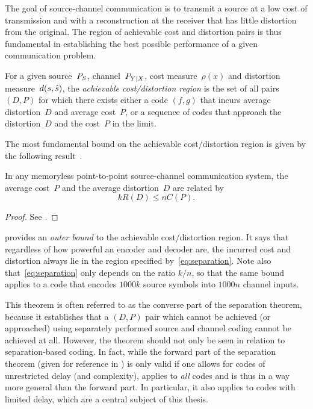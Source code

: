 The goal of source-channel communication is to transmit a source at a low cost
of transmission and with a reconstruction at the receiver that has little
distortion from the original. The region of achievable cost and distortion pairs
is thus fundamental in establishing the best possible performance of a given
communication problem.

\begin{definition}
  \label{def:achievableregion}
  For a given source~${P_S}$, channel~$P_{Y|X}$, cost measure~$\rho(x)$ and
  distortion measure~$d(s,{\hat{s}})$, the \emph{achievable cost\slash distortion
  region} is the set of all pairs $(D,P)$ for which there exists either a code
  $(f,g)$ that incurs average distortion~$D$ and average cost~$P$, or a sequence
  of codes that approach the distortion~$D$ and the cost~$P$ in the limit.
\end{definition}

The most fundamental bound on the achievable cost/distortion region is given by
the following result~\cite[Theorem~21]{Shannon1948}.

\begin{theorem}
  \label{thm:separationconverse}
  In any memoryless point-to-point source-channel communication system, the
  average cost~$P$ and the average distortion~$D$ are related by
  \begin{equation}
    \label{eq:separation}
    kR(D) \le nC(P).
  \end{equation}
\end{theorem}

\begin{proof}
  See .
\end{proof}

 provides an \emph{outer bound} to the achievable
cost/distortion region. It says that regardless of how powerful an encoder and
decoder are, the incurred cost and distortion always lie in the region
specified by~\eqref{eq:separation}. Note also that~\eqref{eq:separation} only
depends on the ratio $k/n$, so that the same bound applies to a code that
encodes $1000k$ source symbols into $1000n$ channel inputs. 

This theorem is often referred to as the converse part of the separation
theorem, because it establishes that a $(D,P)$ pair which cannot be achieved (or
approached) using separately performed source and channel coding cannot be
achieved at all. However, the theorem should not only be seen in relation to
separation-based coding.  In fact, while the forward part of the
separation theorem (given for reference in ) is only
valid if one allows for codes of unrestricted delay (and complexity),
 applies to \emph{all} codes and is thus in a way
more general than the forward part. In particular, it also applies to codes with
limited delay, which are a central subject of this thesis.


